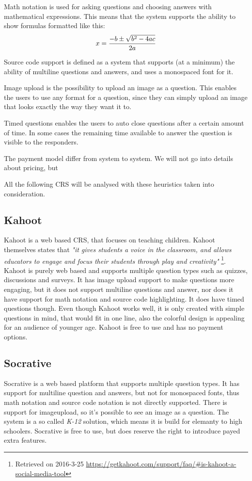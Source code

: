 Math notation is used for asking questions and choosing answers with mathematical expressions. This means that the system supports the ability to show formulas formatted like this: $$x = {-b \pm \sqrt{b^2-4ac} \over 2a}$$

Source code support is defined as a system that supports (at a minimum) the ability of multiline questions and answers, and uses a monospaced font for it. 

Image upload is the possibility to upload an image as a question. This enables the users to use any format for a question, since they can simply upload an image that looks exactly the way they want it to.

Timed questions enables the users to auto close questions after a certain amount of time. In some cases the remaining time available to answer the question is visible to the responders.

The payment model differ from system to system. We will not go into details about pricing, but 


All the following CRS will be analysed with these heuristics taken into consideration.

\subsection*{Kahoot}
Kahoot is a web based CRS, that focuses on teaching children. Kahoot themselves states that  \emph{"it gives students a voice in the classroom, and allows educators to engage and focus their students through play and creativity"} \footnote{Retrieved on 2016-3-25 \url{https://getkahoot.com/support/faq/\#is-kahoot-a-social-media-tool}}. Kahoot is purely web based and supports multiple question types such as quizzes, discussions and surveys. It has image upload support to make questions more engaging, but it does not support multiline questions and answer, nor does it have support for math notation and source code highlighting. It does have timed questions though. Even though Kahoot works well, it is only created with simple questions in mind, that would fit in one line, also the colorful design is appealing for an audience of younger age. Kahoot is free to use and has no payment options.

\subsection*{Socrative}
Socrative is a web based platform that supports multiple question types. It has support for multiline question and answers, but not for monospaced fonts, thus math notation and source code notation is not directly supported. There is support for imageupload, so it's possible to see an image as a question. The system is a so called \emph{K-12} solution, which means it is build for elemanty to high schoolers. Socrative is free to use, but does reserve the right to introduce payed extra features.

